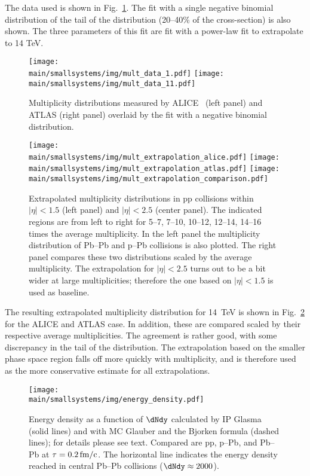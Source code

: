 \documentclass[../report.tex]{subfiles}
\providecommand{\main}{..}
\begin{document}
The data used is shown in Fig.~\ref{fig:smallsystems_mult_data}. The fit with a single negative binomial distribution of the tail of the distribution (20--40\% of the cross-section) is also shown. The three parameters of this fit are fit with a power-law fit to extrapolate to 14 TeV.

\begin{figure}[ht]
\centering
\texttt{[image: \\main/smallsystems/img/mult\_data\_1.pdf]}
\hfill
\texttt{[image: \\main/smallsystems/img/mult\_data\_11.pdf]}
\caption{Multiplicity distributions measured by ALICE~\cite{Adam:2015gka} (left panel) and ATLAS\cite{Aad:2010ac,Aad:2016xww} (right panel) overlaid by the fit with a negative binomial distribution.}
\label{fig:smallsystems_mult_data}
\end{figure}

\begin{figure}[ht]
\centering
\texttt{[image: \\main/smallsystems/img/mult\_extrapolation\_alice.pdf]}
\texttt{[image: \\main/smallsystems/img/mult\_extrapolation\_atlas.pdf]}
\texttt{[image: \\main/smallsystems/img/mult\_extrapolation\_comparison.pdf]}
\caption{Extrapolated multiplicity distributions in pp collisions within $|\eta| < 1.5$ (left panel) and $|\eta| < 2.5$ (center panel). The indicated regions are from left to right for 5--7, 7--10, 10--12, 12--14, 14--16 times the average multiplicity. In the left panel the multiplicity distribution of Pb--Pb and p--Pb collisions is also plotted. The right panel compares these two distributions scaled by the average multiplicity. The extrapolation for $|\eta| < 2.5$ turns out to be a bit wider at large multiplicities; therefore the one based on $|\eta| < 1.5$ is used as baseline.}
\label{fig:smallsystems_mult_extrapolation}
\end{figure}

The resulting extrapolated multiplicity distribution for 14~TeV is shown in Fig.~\ref{fig:smallsystems_mult_extrapolation} for the ALICE and ATLAS case. In addition, these are compared scaled by their respective average multiplicities. The agreement is rather good, with some discrepancy in the tail of the distribution. The extrapolation based on the smaller phase space region falls off more quickly with multiplicity, and is therefore used as the more conservative estimate for all extrapolations.

\begin{figure}[ht]
\centering
\texttt{[image: \\main/smallsystems/img/energy\_density.pdf]}
\caption{Energy density as a function of $\dNdy$ calculated by IP Glasma (solid lines) and with MC Glauber and the Bjorken formula (dashed lines); for details please see text. Compared are pp, p--Pb, and Pb--Pb at $\tau = \unit[0.2]{fm/c}$. The horizontal line indicates the energy density reached in central Pb--Pb collisions ($\dNdy \approx 2000$).}
\label{fig:energy_density}
\end{figure}
\end{document}
